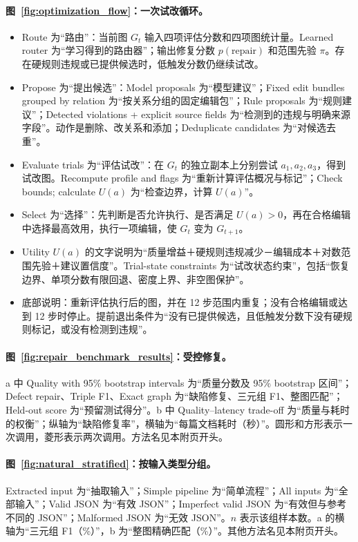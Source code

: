 \paragraph{图~\ref{fig:optimization_flow}：一次试改循环。}
\begin{itemize}
\item Route 为“路由”：当前图 $G_t$ 输入四项评估分数和四项图统计量。Learned router 为“学习得到的路由器”；输出修复分数 $p(\mathrm{repair})$ 和范围先验 $\pi$。存在硬规则违规或已提供候选时，低触发分数仍继续试改。
\item Propose 为“提出候选”：Model proposals 为“模型建议”；Fixed edit bundles grouped by relation 为“按关系分组的固定编辑包”；Rule proposals 为“规则建议”；Detected violations + explicit source fields 为“检测到的违规与明确来源字段”。动作是删除、改关系和添加；Deduplicate candidates 为“对候选去重”。
\item Evaluate trials 为“评估试改”：在 $G_t$ 的独立副本上分别尝试 $a_1,a_2,a_3$，得到试改图。Recompute profile and flags 为“重新计算评估概况与标记”；Check bounds; calculate $U(a)$ 为“检查边界，计算 $U(a)$”。
\item Select 为“选择”：先判断是否允许执行、是否满足 $U(a)>0$，再在合格编辑中选择最高效用，执行一项编辑，使 $G_t$ 变为 $G_{t+1}$。
\item Utility $U(a)$ 的文字说明为“质量增益＋硬规则违规减少－编辑成本＋对数范围先验＋建议置信度”。Trial-state constraints 为“试改状态约束”，包括“恢复边界、单项分数有限回退、密度上界、非空图保护”。
\item 底部说明：重新评估执行后的图，并在 12 步范围内重复；没有合格编辑或达到 12 步时停止。提前退出条件为“没有已提供候选，且低触发分数下没有硬规则标记，或没有检测到违规”。
\end{itemize}

\paragraph{图~\ref{fig:repair_benchmark_results}：受控修复。}
a 中 Quality with 95\% bootstrap intervals 为“质量分数及 95\% bootstrap 区间”；Defect repair、Triple F1、Exact graph 为“缺陷修复、三元组 F1、整图匹配”；Held-out score 为“预留测试得分”。b 中 Quality--latency trade-off 为“质量与耗时的权衡”；纵轴为“缺陷修复率”，横轴为“每篇文档耗时（秒）”。圆形和方形表示一次调用，菱形表示两次调用。方法名见本附页开头。

\paragraph{图~\ref{fig:natural_stratified}：按输入类型分组。}
Extracted input 为“抽取输入”；Simple pipeline 为“简单流程”；All inputs 为“全部输入”；Valid JSON 为“有效 JSON”；Imperfect valid JSON 为“有效但与参考不同的 JSON”；Malformed JSON 为“无效 JSON”。$n$ 表示该组样本数。a 的横轴为“三元组 F1（\%）”，b 为“整图精确匹配（\%）”。其他方法名见本附页开头。

